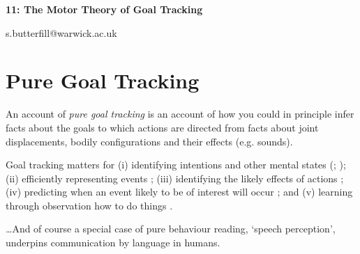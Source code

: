 \documentclass[12pt]{extarticle}
\date{}
\makeatletter
\def \ititle {Philosophical Psychology}
\def \iemail{s.butterfill@warwick.ac.uk}
\makeatother
\begin{document}
\begin{multicols*}{3}

\setlength\footnotesep{1em}










\def \ititle {11: The Motor Theory of Goal Tracking}

\begin{center}

{\Large

\textbf{\ititle}

}



\iemail %

\end{center}

 

 
\section{Pure Goal Tracking}
 
An account of \emph{pure goal tracking} is an account of how you could 
in principle infer facts about the goals to which actions are directed from
facts about joint displacements, bodily configurations and their effects 
(e.g. sounds).

Goal tracking matters for (i) identifying intentions and other mental states (\citealp[p.~861]{Newtson:1977dw}; \citealp[p.~708]{Baldwin:2001rn}); (ii)  efficiently representing events \citep{Kurby:2008bk}; (iii) identifying the likely effects of actions \citep{Byrne:1999jk}; (iv) predicting when an event likely to be of interest will occur \citep[p.~121]{Swallow:2008cf};
and (v) learning through observation how to do things \citep{Byrne:2003wx}.

\dots And of course a special case of pure behaviour reading, ‘speech perception’, underpins communication by language in humans.
 

\end{multicols*}
\end{document}
